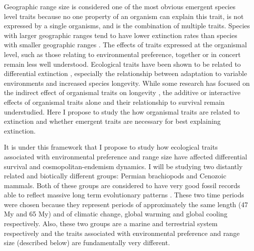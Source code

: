 \documentclass[12pt,letterpaper]{article}
\begin{document}
Geographic range size is considered one of the most obvious emergent species level traits \citep{Jablonski2008a} because no one property of an organism can explain this trait, is not expressed by a single organisms, and is the combination of multiple traits. Species with larger geographic ranges tend to have lower extinction rates than species with smaller geographic ranges \citep{Jablonski1986,Harnik2013,Nurnberg2013a,Jablonski2003,Roy2009c}. The effects of traits expressed at the organismal level, such as those relating to environmental preference, together or in concert remain less well understood. Ecological traits have been shown to be related to differential extinction \citep{Foote2013,Liow2007b,Baumiller1993,Nurnberg2013a}, especially the relationship between adaptation to variable environments and increased species longevity. While some research has focused on the indirect effect of organismal traits on longevity \citep{Harnik2011}, the additive or interactive effects of organismal traits alone and their relationship to survival remain understudied. Here I propose to study the how organismal traits are related to extinction and whether emergent traits are necessary for best explaining extinction.


It is under this framework that I propose to study how ecological traits associated with environmental preference and range size have affected differential survival and cosmopolitan-endemism dynamics. I will be studying two distantly related and biotically different groups: Permian brachiopods and Cenozoic mammals. Both of these groups are considered to have very good fossil records able to reflect massive long term evolutionary patterns \citep{Mark1977}. These two time periods were chosen because they represent periods of approximately the same length (47 My and 65 My) and of climatic change, global warming and global cooling respectively. Also, these two groups are a marine and terrestrial system respectively and the traits associated with environmental preference and range size (described below) are fundamentally very different. 
\end{document}
